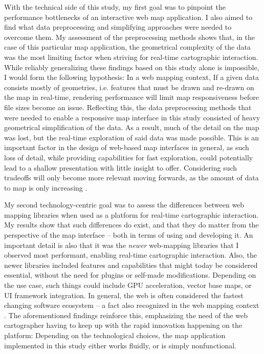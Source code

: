 With the technical side of this study, my first goal was to pinpoint
the performance bottlenecks of
an interactive web map application.
I also aimed to find what data preprocessing and simplifying approaches
were needed to overcome them.
My assessment of the preprocessing methods shows that, in the case of this particular
map application, the geometrical complexity of the data was the most limiting factor
when striving for real-time cartographic interaction.
While reliably generalizing these findings based on this study alone is impossible,
I would form the following hypothesis:
In a web mapping context, If a given data consists mostly of geometries, i.e.
features that must be drawn and re-drawn on the map in real-time,
rendering performance will limit map responsiveness before file sizes become an issue.
Reflecting this,
the data preprocessing methods that were needed
to enable a responsive map interface in this study
consisted of heavy geometrical simplification of the data.
As a result, much of the detail on the map was lost,
but the real-time exploration of said data was made possible.
This is an important factor in the design of
web-based map interfaces in general,
as such loss of detail, while providing capabilities for fast exploration,
could potentially lead to
a shallow presentation with little insight to offer.
Considering such tradeoffs will only become more relevant moving forwards,
as the amount of data to map is only increasing \parencite{kra2021, un2023}.

My second technology-centric goal was to assess
the differences between web mapping libraries
when used as a platform for real-time cartographic interaction.
My results show that such differences do exist,
and that they do matter from the perspective of the map interface --
both in terms of using and developing it.
An important detail is also that
it was the \textit{newer} web-mapping libraries that I observed most performant,
enabling real-time cartographic interaction.
Also, the newer libraries included features and capabilities
that might today be considered essential,
without the need for plugins or self-made modifications.
Depending on the use case, such things could include GPU acceleration,
vector base maps, or UI framework integration.
In general, the web is often considered the fastest changing
software ecosystem \parencite{mik2019, tai2017} --
a fact also recognized in the web mapping context
\parencite{rot2014, vee2017}.
The aforementioned findings reinforce this, emphasizing the need of the web cartographer
having to keep up with the rapid innovation happening on the platform:
Depending on the technological choices, the map application implemented in this study
either works fluidly, or is simply nonfunctional.

